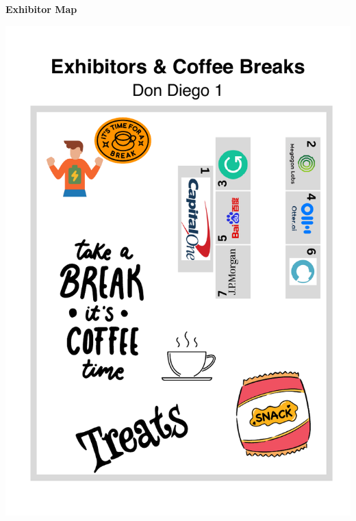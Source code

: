 \clearpage
\begin{center}
  \vspace{4em}

  {\huge\bf Exhibitor Map}

  \vspace{1em}

  \includegraphics[width=\linewidth]{content/exhibitor-map}
\end{center}